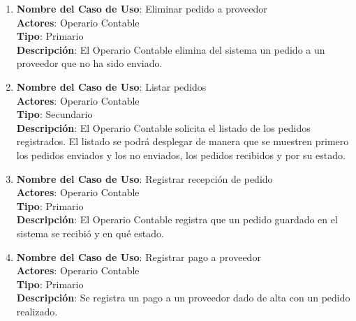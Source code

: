 \documentclass[12pt]{extarticle}
\begin{document}
\begin{spacing}{1.2}
\begin{enumerate}
            \item 	\textbf{Nombre del Caso de Uso}: Eliminar pedido a proveedor\\
                    \textbf{Actores}: Operario Contable\\
                    \textbf{Tipo}: Primario\\
                    \textbf{Descripción}: El Operario Contable elimina del sistema un pedido a un proveedor que no ha sido enviado.


            \item 	\textbf{Nombre del Caso de Uso}: Listar pedidos \\
                    \textbf{Actores}: Operario Contable\\
                    \textbf{Tipo}: Secundario\\
                    \textbf{Descripción}: El Operario Contable solicita el listado de los pedidos registrados. El listado se podrá desplegar de manera que se muestren primero los pedidos enviados y los no enviados, los pedidos recibidos y por su estado.

            \item 	\textbf{Nombre del Caso de Uso}: Registrar recepción de pedido\\
                    \textbf{Actores}: Operario Contable\\
                    \textbf{Tipo}: Primario\\
                    \textbf{Descripción}: El Operario Contable registra que un pedido guardado en el sistema se recibió y en qué estado. 

            \item 	\textbf{Nombre del Caso de Uso}: Registrar pago a proveedor\\
                    \textbf{Actores}: Operario Contable\\
                    \textbf{Tipo}: Primario\\
                    \textbf{Descripción}: Se registra un pago a un proveedor dado de alta con un pedido realizado.
        \end{enumerate}
        \clearpage

















\end{spacing}
\end{document}
